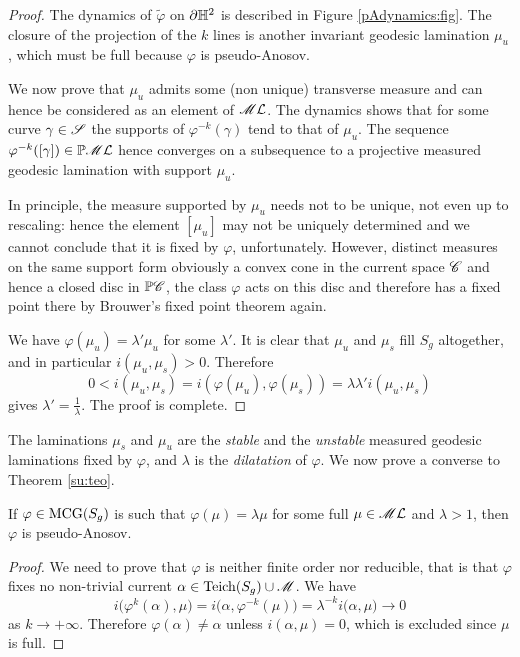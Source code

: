 \begin{proof}
The dynamics of $\tilde \varphi$ on $\partial \mathbb{H}^2$ is described in Figure \ref{pAdynamics:fig}. %
The closure of the projection of the $k$ \iftoggle{BW}{light grey}{green} lines is another invariant geodesic lamination $\mu_u$, which must be full %
because $\varphi$ is pseudo-Anosov.

We now prove that $\mu_u$ admits some (non unique) transverse measure and can hence be considered as an element of $\mathscr{M}\mathcal{L}$. The dynamics shows that for some curve $\gamma\in\mathscr{S}$ the supports of $\varphi^{-k}(\gamma)$ tend to that of $\mu_u$. The sequence $\varphi^{-k}([\gamma])\in \mathbb{P}\mathscr{M}\mathcal{L}$ hence converges on a subsequence to a projective measured geodesic lamination with support $\mu_u$.

In principle, the measure supported by $\mu_u$ needs not to be unique, not even up to rescaling: hence the element $[\mu_u]$ may not be uniquely determined and we cannot conclude that it is fixed by $\varphi$, unfortunately. However, distinct measures on the same support form obviously a convex cone in the current space $\mathscr{C}$ and hence a closed disc in $\mathbb{P}\mathscr{C}$, the class $\varphi$ acts on this disc and therefore has a fixed point there by Brouwer's fixed point theorem again. 

We have $\varphi(\mu_u) = \lambda' \mu_u$ for some $\lambda'$. 
It is clear that $\mu_u$ and $\mu_s$ fill $S_g$ altogether, and in particular $i(\mu_u, \mu_s) > 0$. Therefore
$$0 < i(\mu_u, \mu_s) = i(\varphi(\mu_u), \varphi(\mu_s)) = \lambda \lambda' i(\mu_u, \mu_s)$$
gives $\lambda' = \frac 1 \lambda$. The proof is complete.
\end{proof}

The laminations $\mu_s$ and $\mu_u$ are the \emph{stable} and the \emph{unstable} measured geodesic laminations fixed by $\varphi$, and $\lambda$ is the \emph{dilatation} of $\varphi$. We now prove a converse to Theorem \ref{su:teo}.

\begin{prop} \label{pA:converse:prop}
If $\varphi \in {\rm MCG}(S_g)$ is such that $\varphi(\mu) = \lambda \mu$ for some full %
$\mu \in \mathscr{M}\mathcal{L}$ and $\lambda > 1$, then $\varphi$ is pseudo-Anosov.
\end{prop}
\begin{proof}
We need to prove that $\varphi$ is neither finite order nor reducible, that is that $\varphi$ fixes no non-trivial current $\alpha \in {\rm Teich}(S_g) \cup \mathscr{M}$. We have 
$$i\big(\varphi^k(\alpha), \mu\big) = i\big(\alpha, \varphi^{-k}(\mu)\big) =
\lambda^{-k}i\big(\alpha, \mu) \to 0$$
as $k\to +\infty$. Therefore $\varphi(\alpha) \neq \alpha$ unless $i(\alpha, \mu)=0$, which is excluded since $\mu$ is full.
\end{proof}

